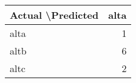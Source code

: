 \begin{tabular}{lr}
\toprule
Actual \textbackslash   Predicted &  alta \\
\midrule
               alta &     1 \\
               altb &     6 \\
               altc &     2 \\
\bottomrule
\end{tabular}
